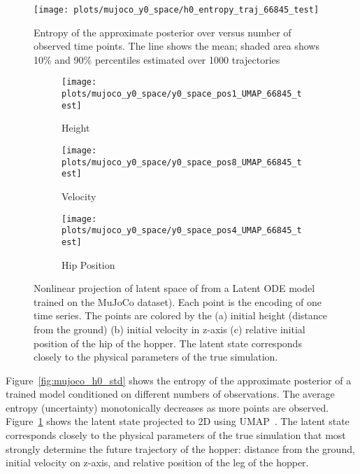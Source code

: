 \documentclass{article}
\begin{document}
\begin{figure}[h]
\centering
\begin{minipage}{.35\textwidth}
\centering
\texttt{[image: plots/mujoco\_y0\_space/h0\_entropy\_traj\_66845\_test]}
\caption{Entropy of the approximate posterior over  versus number of observed time points. The line shows the mean; shaded area shows 10\% and 90\% percentiles estimated over 1000 trajectories}
\label{fig:mujoco_h0_std}
\end{minipage}
\hfill
\begin{minipage}{.62\textwidth}
	\begin{subfigure}[b]{0.32\linewidth}
	\centering
    \texttt{[image: plots/mujoco\_y0\_space/y0\_space\_pos1\_UMAP\_66845\_test]}
    \caption{Height}
    \end{subfigure}\begin{subfigure}[b]{0.32\linewidth}
	\centering
    \texttt{[image: plots/mujoco\_y0\_space/y0\_space\_pos8\_UMAP\_66845\_test]}
    \caption{Velocity}
	\end{subfigure}\begin{subfigure}[b]{0.32\linewidth}
	\centering
    \texttt{[image: plots/mujoco\_y0\_space/y0\_space\_pos4\_UMAP\_66845\_test]}
    \caption{Hip Position}
	\end{subfigure}
\caption{Nonlinear projection of latent space of  from a Latent ODE model trained on the MuJoCo dataset).
Each point is the encoding of one time series.
The points are colored by the (a) initial height (distance from the ground) (b) initial velocity in z-axis (c) relative initial position of the hip of the hopper.
The latent state corresponds closely to the physical parameters of the true simulation.}
\label{fig:mujoco_h0space}
\end{minipage}
\vspace{-5mm}
\end{figure}


Figure~\ref{fig:mujoco_h0_std} shows the entropy of the approximate posterior  of a trained model conditioned on different numbers of observations. The average entropy (uncertainty) monotonically decreases as more points are observed.
Figure~\ref{fig:mujoco_h0space} shows the latent state  projected to 2D using UMAP~\citep{umap}.
The latent state corresponds closely to the physical parameters of the true simulation that most strongly determine the future trajectory of the hopper: distance from the ground, initial velocity on z-axis, and relative position of the leg of the hopper.
\end{document}
